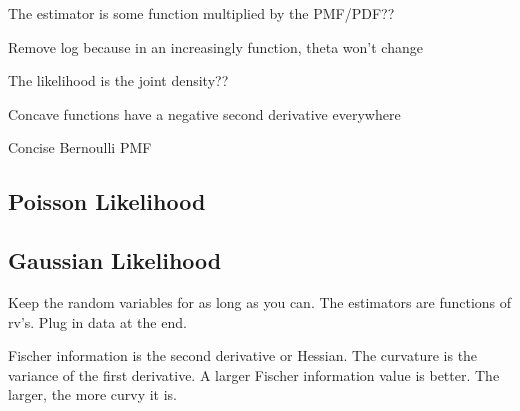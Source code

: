 

 The estimator is some function multiplied by the PMF/PDF??

Remove log because in an increasingly function, theta won’t change

 The likelihood is the joint density??

 Concave functions have a negative second derivative everywhere

Concise Bernoulli PMF

\subsection{Poisson Likelihood}


\subsection{Gaussian Likelihood}

 Keep the random variables for as long as you can.  The estimators are functions of rv’s. Plug in data at the end.

 Fischer information is the second derivative or Hessian.
The curvature is the variance of the first derivative. A larger Fischer information value is better.  The larger, the more curvy it is.


